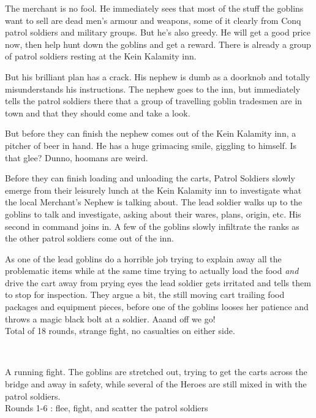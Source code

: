 \begin{readoutloud}
The merchant is no fool. He immediately sees that most of the stuff the goblins want to sell are dead men's armour and weapons, some of it clearly from Conq patrol soldiers and military groups. But he's also greedy. He will get a good price now, then help hunt down the goblins and get a reward. There is already a group of patrol soldiers resting at the Kein Kalamity inn.

But his brilliant plan has a crack. His nephew is dumb as a doorknob and totally misunderstands his instructions. The nephew goes to the inn, but immediately tells the patrol soldiers there that a group of travelling goblin tradesmen are in town and that they should come and take a look.
\end{readoutloud}

\noindent But before they can finish the nephew comes out of the Kein Kalamity inn, a pitcher of beer in hand. He has a huge grimacing smile, giggling to himself. Is that glee? Dunno, hoomans are weird.

Before they can finish loading and unloading the carts, Patrol Soldiers slowly emerge from their leisurely lunch at the Kein Kalamity inn to investigate what the local Merchant's Nephew is talking about. The lead soldier walks up to the goblins to talk and investigate, asking about their wares, plans, origin, etc. His second in command joins in. A few of the goblins slowly infiltrate the ranks as the other patrol soldiers come out of the inn.

As one of the lead goblins do a horrible job trying to explain away all the problematic items while at the same time trying to actually load the food \emph{and} drive the cart away from prying eyes the lead soldier gets irritated and tells them to stop for inspection. They argue a bit, the still moving cart trailing food packages and equipment pieces, before one of the goblins looses her patience and throws a magic black bolt at a soldier. Aaand off we go!\\
Total of 18 rounds, strange fight, no casualties on either side.

\

A running fight. The goblins are stretched out, trying to get the carts across the bridge and away in safety, while several of the Heroes are still mixed in with the patrol soldiers.\\
Rounds 1-6 : flee, fight, and scatter the patrol soldiers

\

